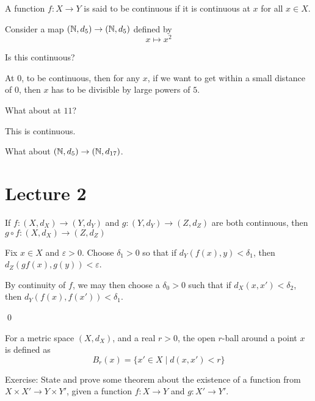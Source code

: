 \documentclass[x11names,reqno,14pt]{extarticle}
\begin{document}
A function $f:X\to Y$ is said to be continuous if it is continuous at $x$ for all $x \in X$. 

\exm

Consider a map $(\mathbb{N}, d_5) \to (\mathbb{N}, d_5)$ defined by 
\[
x\mapsto x^2
\]

Is this continuous? 

At 0, to be continuous, then for any $x$, if we want to get within a small distance of 0, then $x$ has to be divisible by large powers of $5$. 

What about at $11$?

This is continuous. 

\exm

What about $(\mathbb{N},d_5) \to (\mathbb{N}, d_{17})$. 

\section{Lecture 2}

\thm

If $f:(X, d_X)\to (Y, d_Y)$ and $g:(Y, d_Y)\to(Z, d_Z)$ are both continuous, then $g \circ f:(X, d_X)\to(Z, d_Z)$

\proof

Fix $x \in X$ and $\varepsilon>0$. Choose $\delta_1 > 0$ so that if $d_Y(f(x), y) < \delta_1$, then $d_Z(gf(x), g(y)) < \varepsilon$. 

By continuity of $f$, we may then choose a $\delta_0 > 0$ such that if $d_X(x, x') < \delta_2$, then $d_Y(f(x), f(x')) < \delta_1$. 

\qed

 For a metric space $(X, d_X)$, and a real $r > 0$, the open $r$-ball around a point $x$ is defined as
\[
B_r(x) = \{x' \in X \mid d(x, x') < r\}
\]

Exercise: State and prove some theorem about the existence of a function from $X \times X' \to Y \times Y'$, given a function $f:X\to Y$ and $g:X'\to Y'$. 

\end{document}
